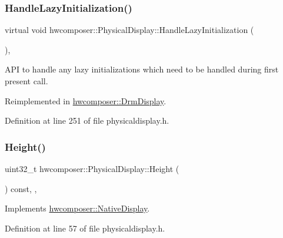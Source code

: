 \subsubsection{\texorpdfstring{Handle\+Lazy\+Initialization()}{HandleLazyInitialization()}}
{\footnotesize\ttfamily virtual void hwcomposer\+::\+Physical\+Display\+::\+Handle\+Lazy\+Initialization (\begin{DoxyParamCaption}{ }\end{DoxyParamCaption})\hspace{0.3cm}{\ttfamily [inline]}, {\ttfamily [virtual]}}

A\+PI to handle any lazy initializations which need to be handled during first present call. 

Reimplemented in \mbox{\hyperlink{classhwcomposer_1_1DrmDisplay_a7dd459cd835df8ff956350d3b53628e8}{hwcomposer\+::\+Drm\+Display}}.



Definition at line 251 of file physicaldisplay.\+h.


\begin{DoxyCode}{0}
\end{DoxyCode}
\mbox{\label{classhwcomposer_1_1PhysicalDisplay_aa6f009efb2eb6733c2476696b54c9461}} 
\subsubsection{\texorpdfstring{Height()}{Height()}}
{\footnotesize\ttfamily uint32\+\_\+t hwcomposer\+::\+Physical\+Display\+::\+Height (\begin{DoxyParamCaption}{ }\end{DoxyParamCaption}) const\hspace{0.3cm}{\ttfamily [inline]}, {\ttfamily [override]}, {\ttfamily [virtual]}}



Implements \mbox{\hyperlink{classhwcomposer_1_1NativeDisplay_a09a19377e64e1fed90ae8315a8e71864}{hwcomposer\+::\+Native\+Display}}.



Definition at line 57 of file physicaldisplay.\+h.


\begin{DoxyCode}{0}
\end{DoxyCode}
\mbox{\label{classhwcomposer_1_1PhysicalDisplay_a594319095f4b6c7078282c56d9cbe9f4}} 
